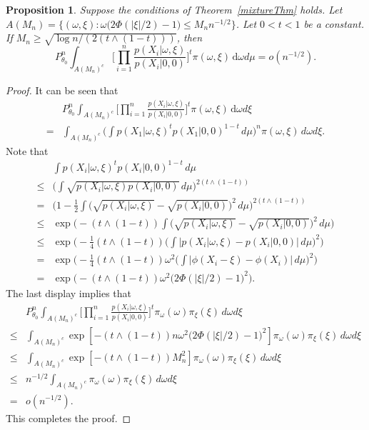 \documentclass[11pt]{article}
\theoremstyle{plain}
\newtheorem{proposition}{\quad\quad Proposition}
\theoremstyle{definition}
\theoremstyle{remark}
\begin{document}
\begin{appendices}
\begin{proposition}\label{lastProp}
    Suppose the conditions of Theorem~\ref{mixtureThm} holds.
    Let $A(M_n)=\{(\omega, \xi): \omega \big( 2\Phi(|\xi|/2)-1\big)\leq M_n n^{-1/2}\}$.
    Let $0<t<1$ be a constant.
    If $M_n \geq \sqrt{{\log n}/(2(t\wedge (1-t)))}$, then
    \begin{equation*}
        P^n_{\theta_0} \int_{A(M_n)^c} \Big[\prod_{i=1}^n \frac{p(X_i|\omega,\xi)}{p(X_i|0,0)}\Big]^t \pi(\omega,\xi)\, \mathrm  d\omega d\mu =o(n^{-1/2}).
    \end{equation*}
\end{proposition}
\begin{proof}
    It can be seen that
\begin{equation*}
    \begin{split}
    &P^n_{\theta_0} \int_{A(M_n)^c} \Big[\prod_{i=1}^n \frac{p(X_i|\omega,\xi)}{p(X_i|0,0)}\Big]^t \pi(\omega,\xi)\, \mathrm d\omega d\xi
    \\
    =&
    \int_{A(M_n)^c} \big( \int p(X_1|\omega,\xi)^t p(X_1|0,0)^{1-t}\, d\mu\big)^n \pi(\omega,\xi)\, d\omega d\xi.
    \end{split}
\end{equation*}
Note that
\begin{align*}
    &\int p(X_i|\omega,\xi)^t p(X_i|0,0)^{1-t}\, d\mu
    \\
    \leq&  \Big(\int \sqrt{p(X_i|\omega,\xi) p(X_i|0,0)}\, d\mu\Big)^{2(t\wedge (1-t))}
    \\
= & \Big(1-\frac{1}{2}\int \big(\sqrt{p(X_i|\omega,\xi) }-\sqrt{p(X_i|0,0)}\big)^2\, d\mu\Big)^{2(t\wedge (1-t))}
\\
\leq & \exp \Big( -(t\wedge (1-t))\int \big(\sqrt{p(X_i|\omega,\xi) }-\sqrt{p(X_i|0,0)}\big)^2\, d\mu \Big)
\\
\leq & \exp \Big( -\frac{1}{4}(t\wedge (1-t)) \big(\int \big| p(X_i|\omega,\xi)-p(X_i|0,0)\big|\, d\mu \big)^2 \Big)
\\
= & \exp \Big( -\frac{1}{4}(t\wedge (1-t)) \omega^2 \big(\int \big| \phi(X_i -\xi)-\phi (X_i)\big|\, d\mu \big)^2 \Big)
\\
= & \exp \Big( -(t\wedge (1-t)) \omega^2 \big( 2\Phi(|\xi|/2)-1\big)^2 \Big).
\end{align*}
The last display implies that
\begin{align*}
    &P^n_{\theta_0} \int_{A(M_n)^c} \Big[\prod_{i=1}^n \frac{p(X_i|\omega,\xi)}{p(X_i|0,0)}\Big]^t \pi_{\omega}(\omega)\pi_{\xi}(\xi)\, d\omega d\xi
\\
    \leq
    &
    \int_{A(M_n)^c} \exp \left[ -(t\wedge (1-t)) n\omega^2 \big( 2\Phi(|\xi|/2)-1\big)^2 \right]
    \pi_{\omega}(\omega) \pi_\xi(\xi)\, d\omega d\xi
    \\
    \leq
    &
    \int_{A(M_n)^c} \exp \left[ -(t\wedge (1-t)) M_n^2 \right]
    \pi_{\omega}(\omega) \pi_\xi(\xi)\, d\omega d\xi
\\
    \leq
    &
    n^{-1/2}
    \int_{A(M_n)^c} 
\pi_{\omega}(\omega) \pi_\xi(\xi)\, d\omega d\xi
\\
=&o(n^{-1/2}).
\end{align*}
This completes the proof.





\end{proof}
\end{appendices}
\end{document}
